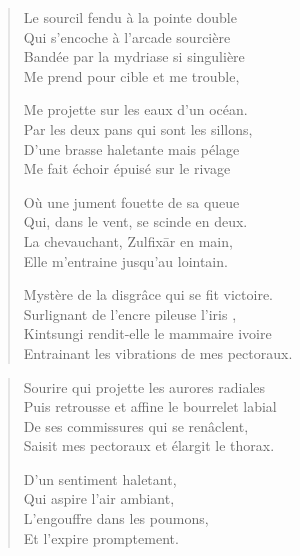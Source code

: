 \begin{verse}
Le sourcil fendu à la pointe double\\
Qui s’encoche à l’arcade sourcière\\
Bandée par la mydriase si singulière\\
Me prend pour cible et me trouble,

Me projette sur les eaux d’un océan.\\
Par les deux pans qui sont les sillons,\\
D’une brasse haletante mais pélage\\
Me fait échoir épuisé sur le rivage

Où une jument fouette de sa queue\\
Qui, dans le vent, se scinde en deux.\\
La chevauchant, Zulfixār en main,\\
Elle m’entraine jusqu’au lointain.

Mystère de la disgrâce qui se fit victoire.\\
Surlignant de l’encre pileuse l’iris \label{foot.barroco},\\
Kintsungi rendit-elle le mammaire ivoire\\
Entrainant les vibrations de mes pectoraux.
\end{verse}


\begin{verse}
Sourire qui projette les aurores radiales\\
Puis retrousse et affine le bourrelet labial\\
De ses commissures qui se renâclent,\\
Saisit mes pectoraux et élargit le thorax.

D’un sentiment haletant,\\
Qui aspire l’air ambiant,\\
L’engouffre dans les poumons,\\
Et l’expire promptement.
\end{verse}

